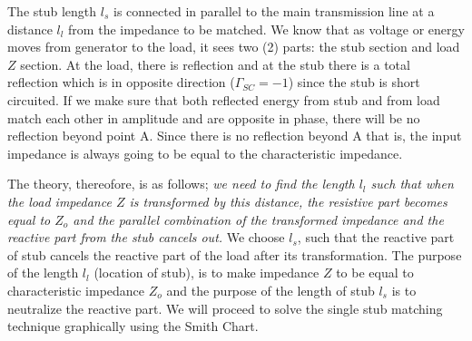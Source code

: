  The stub length $l_s$ is connected in parallel to the main transmission line at a distance $ l_l$ from the impedance to be matched. We know that as voltage or energy moves from generator to the load, it sees two (2) parts: the stub section and load $Z$ section. At the load, there is reflection and at the stub there is a total reflection which is in opposite direction ($\Gamma_{SC} = -1$) since the stub is short circuited. If we make sure that both reflected energy from stub and from load match each other in amplitude and are opposite in phase, there will be no reflection beyond point A. Since there is no reflection beyond A that is, the input impedance is always going to be equal to the characteristic impedance.

The theory, thereofore, is as follows; \emph{we need to find the length $ l_l$ such that when the load impedance $Z$ is transformed by this distance, the resistive part becomes equal to $Z_o$ and the parallel combination of the transformed impedance and the reactive part from the stub cancels out.} We choose $l_s$, such that the reactive part of stub cancels the reactive part of the load after its transformation. The purpose of the length $l_l$ (location of stub), is to make impedance $Z$ to be equal to characteristic impedance $Z_o$ and the purpose of the length of stub $l_s$ is to neutralize the reactive part. We will proceed to solve the single stub matching technique graphically using the Smith Chart.

